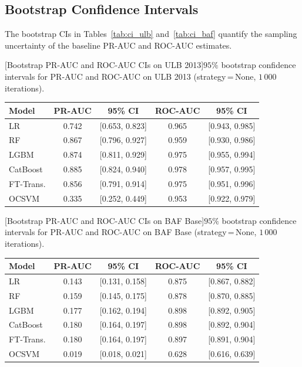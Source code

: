\subsection{Bootstrap Confidence Intervals}

The bootstrap CIs in Tables~\ref{tab:ci_ulb} and~\ref{tab:ci_baf} quantify the sampling uncertainty of the baseline PR-AUC and ROC-AUC estimates.

\noindent\begin{minipage}{\linewidth}\centering
{}[Bootstrap PR-AUC and ROC-AUC CIs on ULB 2013]{$95\%$ bootstrap confidence intervals for PR-AUC and ROC-AUC on ULB 2013 (strategy\,=\,None, $1\,000$ iterations).}
\label{tab:ci_ulb}
\begin{tabular}{l c c c c}
\toprule
Model & PR-AUC & 95\% CI & ROC-AUC & 95\% CI \\
\midrule
LR         & 0.742 & [0.653, 0.823] & 0.965 & [0.943, 0.985] \\
RF         & 0.867 & [0.796, 0.927] & 0.959 & [0.930, 0.986] \\
LGBM       & 0.874 & [0.811, 0.929] & 0.975 & [0.955, 0.994] \\
CatBoost   & 0.885 & [0.824, 0.940] & 0.978 & [0.957, 0.995] \\
FT-Trans.  & 0.856 & [0.791, 0.914] & 0.975 & [0.951, 0.996] \\
OCSVM      & 0.335 & [0.252, 0.449] & 0.953 & [0.922, 0.979] \\
\bottomrule
\end{tabular}
\end{minipage}

\noindent\begin{minipage}{\linewidth}\centering
{}[Bootstrap PR-AUC and ROC-AUC CIs on BAF Base]{$95\%$ bootstrap confidence intervals for PR-AUC and ROC-AUC on BAF Base (strategy\,=\,None, $1\,000$ iterations).}
\label{tab:ci_baf}
\begin{tabular}{l c c c c}
\toprule
Model & PR-AUC & 95\% CI & ROC-AUC & 95\% CI \\
\midrule
LR         & 0.143 & [0.131, 0.158] & 0.875 & [0.867, 0.882] \\
RF         & 0.159 & [0.145, 0.175] & 0.878 & [0.870, 0.885] \\
LGBM       & 0.177 & [0.162, 0.194] & 0.898 & [0.892, 0.905] \\
CatBoost   & 0.180 & [0.164, 0.197] & 0.898 & [0.892, 0.904] \\
FT-Trans.  & 0.180 & [0.164, 0.197] & 0.897 & [0.891, 0.904] \\
OCSVM      & 0.019 & [0.018, 0.021] & 0.628 & [0.616, 0.639] \\
\bottomrule
\end{tabular}
\end{minipage}

